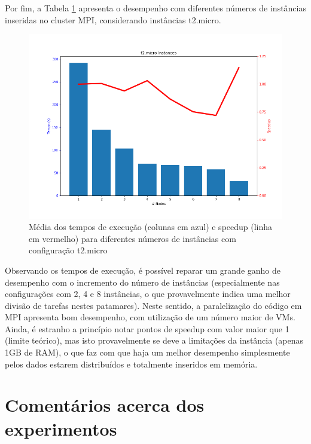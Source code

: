 \documentclass[a4paper,11pt]{article}
\begin{document}
Por fim, a Tabela \ref{fig:tempot2micro} apresenta o desempenho com diferentes números de instâncias inseridas no cluster MPI, considerando instâncias t2.micro.


\begin{figure}[h!]
	\center
	\includegraphics[scale=0.4]{figs/t2microTime.png}
	\caption{Média dos tempos de execução (colunas em azul) e speedup (linha em vermelho)  para diferentes números de instâncias com configuração t2.micro}
	\label{fig:tempot2micro}
\end{figure}

Observando os tempos de execução, é possível reparar um grande ganho de desempenho com o incremento do número de instâncias (especialmente nas configurações com 2, 4 e 8 instâncias, o que provavelmente indica uma melhor divisão de tarefas nestes patamares). 
Neste sentido, a paralelização do código em MPI apresenta bom desempenho, com utilização de um número maior de VMs. Ainda, é estranho a princípio notar pontos de speedup com valor maior que 1 (limite teórico), mas isto provavelmente se deve a limitações da instância (apenas 1GB de RAM), o que faz com que haja um melhor desempenho simplesmente pelos dados estarem distribuídos e totalmente inseridos em memória.

\vspace{0.3cm}

\section{Comentários acerca dos experimentos}

\vspace{0.3cm}
\end{document}
